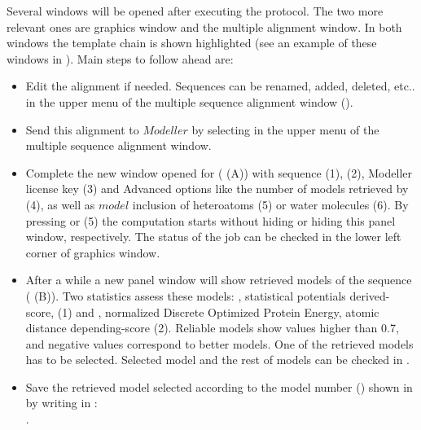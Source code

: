 \begin{itemize}
  Several \chimera windows will be opened after executing the protocol. The two more relevant ones are \chimera graphics window and the multiple alignment window. In both windows the template chain is shown highlighted (see an example of these windows in ). Main steps to follow ahead are:
  \begin{itemize}
   \item Edit the alignment if needed. Sequences can be renamed, added, deleted, etc.. in the upper menu of the multiple sequence alignment window ().
   \item Send this alignment to $Modeller$ by selecting  in the upper menu of the multiple sequence alignment window. 
   \item Complete the new window opened for  ( (A)) with  sequence (1),  (2), Modeller license key (3) and Advanced options like the number of models retrieved by \modeller (4), as well as $model$ inclusion of heteroatoms (5) or water molecules (6). By pressing  or  (5) the computation starts without hiding or hiding this panel window, respectively. The status of the job can be checked in the lower left corner of \chimera graphics window.
   \item After a while a new panel window will show retrieved models of the  sequence ( (B)). Two statistics assess these models: , statistical potentials derived-score, (1) and , normalized Discrete Optimized Protein Energy, atomic distance depending-score (2). Reliable models show  values higher than 0.7, and negative  values correspond to better models. One of the retrieved models has to be selected. Selected model and the rest of models can be checked in \chimera {}.
   \item Save the retrieved model selected according to the model number () shown in \chimera {} by writing in \chimera {}:\\.
  \end{itemize}
  

\end{itemize}
